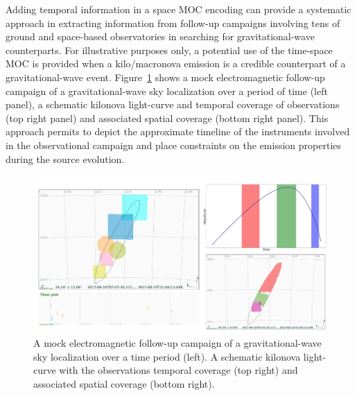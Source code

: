 \documentclass[11pt,a4paper]{ivoa}
\begin{document}
Adding temporal information in a space MOC encoding can provide a
systematic approach in extracting information from follow-up campaigns
involving tens of ground and space-based observatories in searching
for gravitational-wave counterparts.
For illustrative purposes only, a potential use of the time-space MOC
is provided when a kilo/macronova emission is a credible counterpart of a
gravitational-wave event. 
Figure~\ref{fig:gw} shows a mock electromagnetic
follow-up campaign of a gravitational-wave sky localization over a period
of time (left panel), a schematic kilonova light-curve and
temporal coverage of observations (top right panel) and associated
spatial coverage (bottom right panel). This approach permits to depict
the approximate timeline of the instruments involved in the observational
campaign and place constraints on the emission properties during the
source evolution.

\begin{figure}[!htbp]
\begin{center}
\includegraphics[width=\textwidth]{kilo.png}
\end{center}
\caption{A mock electromagnetic follow-up campaign
  of a gravitational-wave sky localization over a time period (left).
  A schematic kilonova light-curve with the observations temporal
  coverage (top right) and associated spatial coverage (bottom right).}
\label{fig:gw} 
\end{figure} 

\end{document}
